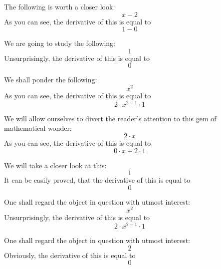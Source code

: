 \documentclass{article}
\begin{document}
The following is worth a closer look:
\begin{equation}
x - 2 
\end{equation}
As you can see, the derivative of this is equal to
\begin{equation}
1 - 0 
\end{equation}

We are going to study the following:
\begin{equation}
1 
\end{equation}
Unsurprisingly, the derivative of this is equal to
\begin{equation}
0 
\end{equation}

We shall ponder the following:
\begin{equation}
x ^{2 } 
\end{equation}
As you can see, the derivative of this is equal to
\begin{equation}
2 \cdot x ^{2 - 1 } \cdot 1 
\end{equation}

We will allow ourselves to divert the reader's attention to this gem of mathematical wonder:
\begin{equation}
2 \cdot x 
\end{equation}
As you can see, the derivative of this is equal to
\begin{equation}
0 \cdot x + 2 \cdot 1 
\end{equation}

We will take a closer look at this:
\begin{equation}
1 
\end{equation}
It can be easily proved, that the derivative of this is equal to
\begin{equation}
0 
\end{equation}

One shall regard the object in question with utmost interest:
\begin{equation}
x ^{2 } 
\end{equation}
Unsurprisingly, the derivative of this is equal to
\begin{equation}
2 \cdot x ^{2 - 1 } \cdot 1 
\end{equation}

One shall regard the object in question with utmost interest:
\begin{equation}
2 
\end{equation}
Obviously, the derivative of this is equal to
\begin{equation}
0 
\end{equation}
\end{document}
